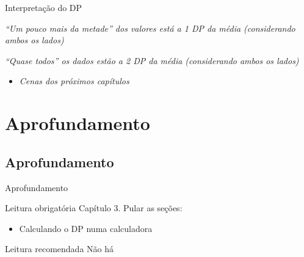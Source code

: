\documentclass{beamer}
\begin{document}
\begin{frame}{\scriptsize Interpretação do DP}
  \begin{block}{}
    \footnotesize
    {\em ``Um pouco mais da metade'' dos valores está a 1 DP da média (considerando ambos os lados)}
  \end{block}
  \begin{block}{}
    \footnotesize
    {\em ``Quase todos'' os dados estão a 2 DP da média (considerando ambos os lados)}
  \end{block}
  \begin{itemize}
    \footnotesize
  \item {\em Cenas dos próximos capítulos}
  \end{itemize}
\end{frame}


\section{Aprofundamento}

\subsection{Aprofundamento}

\begin{frame}{\scriptsize Aprofundamento}
  \begin{block}{Leitura obrigatória}
    \footnotesize
    Capítulo 3. Pular as seções:
    \begin{itemize}
      \footnotesize
    \item Calculando o DP numa calculadora
    \end{itemize}
  \end{block}
  \begin{block}{Leitura recomendada}
    \scriptsize
    Não há
  \end{block}
\end{frame}
\end{document}
